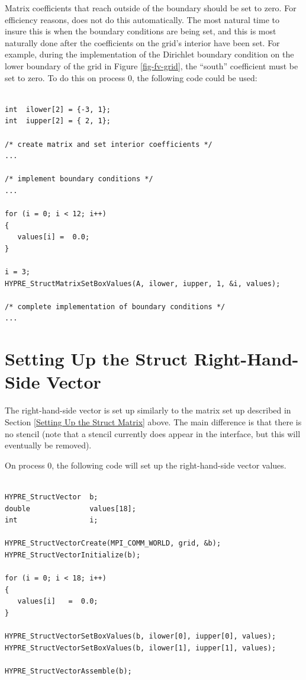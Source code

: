 Matrix coefficients that reach outside of the boundary should be set
to zero.  For efficiency reasons, \hypre{} does not do this
automatically.  The most natural time to insure this is when the
boundary conditions are being set, and this is most naturally done
after the coefficients on the grid's interior have been set.  For
example, during the implementation of the Dirichlet boundary condition
on the lower boundary of the grid in Figure \ref{fig-fv-grid}, the
``south'' coefficient must be set to zero.  To do this on process 0,
the following code could be used:
\begin{display}
\begin{verbatim}

int  ilower[2] = {-3, 1};
int  iupper[2] = { 2, 1};

/* create matrix and set interior coefficients */
...

/* implement boundary conditions */
...

for (i = 0; i < 12; i++)
{
   values[i] =  0.0;
}

i = 3;
HYPRE_StructMatrixSetBoxValues(A, ilower, iupper, 1, &i, values);

/* complete implementation of boundary conditions */
...

\end{verbatim}
\end{display}


\section{Setting Up the Struct Right-Hand-Side Vector}
\label{Setting Up the Struct Right-Hand-Side Vector}

The right-hand-side vector is set up similarly to the matrix set up
described in Section \ref{Setting Up the Struct Matrix} above.  The main
difference is that there is no stencil (note that a stencil currently
does appear in the interface, but this will eventually be removed).

On process 0, the following code will set up the right-hand-side
vector values.
\begin{display}
\begin{verbatim}

HYPRE_StructVector  b;
double              values[18];
int                 i;

HYPRE_StructVectorCreate(MPI_COMM_WORLD, grid, &b);
HYPRE_StructVectorInitialize(b);

for (i = 0; i < 18; i++)
{
   values[i]   =  0.0;
}

HYPRE_StructVectorSetBoxValues(b, ilower[0], iupper[0], values);
HYPRE_StructVectorSetBoxValues(b, ilower[1], iupper[1], values);

HYPRE_StructVectorAssemble(b);

\end{verbatim}
\end{display}

